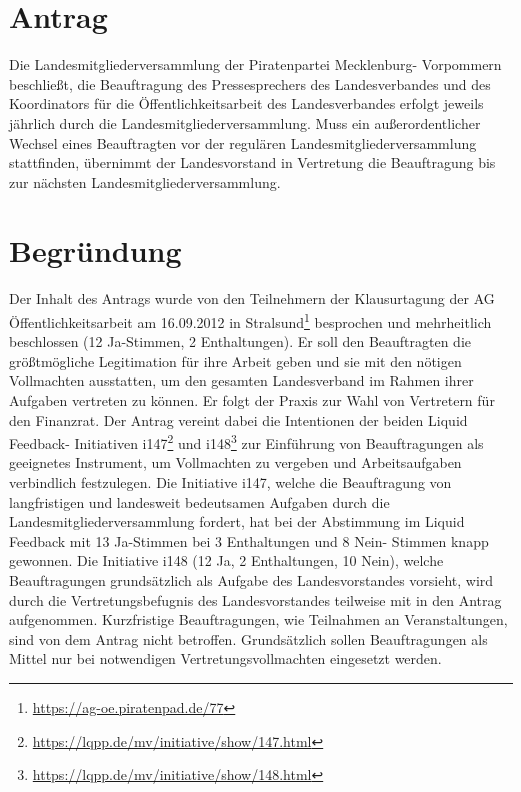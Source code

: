 \section{Antrag}

Die Landesmitgliederversammlung der Piratenpartei Mecklenburg- Vorpommern beschließt, die Beauftragung des Pressesprechers des Landesverbandes und des Koordinators für die Öffentlichkeitsarbeit des Landesverbandes erfolgt jeweils jährlich durch die Landesmitgliederversammlung. Muss ein außerordentlicher Wechsel eines Beauftragten vor der regulären Landesmitgliederversammlung stattfinden, übernimmt der Landesvorstand in Vertretung die Beauftragung bis zur nächsten Landesmitgliederversammlung.

\section{Begründung}

Der Inhalt des Antrags wurde von den Teilnehmern der Klausurtagung der AG Öffentlichkeitsarbeit am 16.09.2012 in Stralsund\footnote{\url{https://ag-oe.piratenpad.de/77}} besprochen und mehrheitlich beschlossen (12 Ja-Stimmen, 2 Enthaltungen). Er soll den Beauftragten die größtmögliche Legitimation für ihre Arbeit geben und sie mit den nötigen Vollmachten ausstatten, um den gesamten Landesverband im Rahmen ihrer Aufgaben vertreten zu können. Er folgt der Praxis zur Wahl von Vertretern für den Finanzrat. Der Antrag vereint dabei die Intentionen der beiden Liquid Feedback- Initiativen i147\footnote{\url{https://lqpp.de/mv/initiative/show/147.html}} und i148\footnote{\url{https://lqpp.de/mv/initiative/show/148.html}} zur Einführung von Beauftragungen als geeignetes Instrument, um Vollmachten zu vergeben und Arbeitsaufgaben verbindlich festzulegen. Die Initiative i147, welche die Beauftragung von langfristigen und landesweit bedeutsamen Aufgaben durch die Landesmitgliederversammlung fordert, hat bei der Abstimmung im Liquid Feedback mit 13 Ja-Stimmen bei 3 Enthaltungen und 8 Nein- Stimmen knapp gewonnen. Die Initiative i148 (12 Ja, 2 Enthaltungen, 10 Nein), welche Beauftragungen grundsätzlich als Aufgabe des Landesvorstandes vorsieht, wird durch die Vertretungsbefugnis des Landesvorstandes teilweise mit in den Antrag aufgenommen. Kurzfristige Beauftragungen, wie Teilnahmen an Veranstaltungen, sind von dem Antrag nicht betroffen. Grundsätzlich sollen Beauftragungen als Mittel nur bei notwendigen Vertretungsvollmachten eingesetzt werden.
